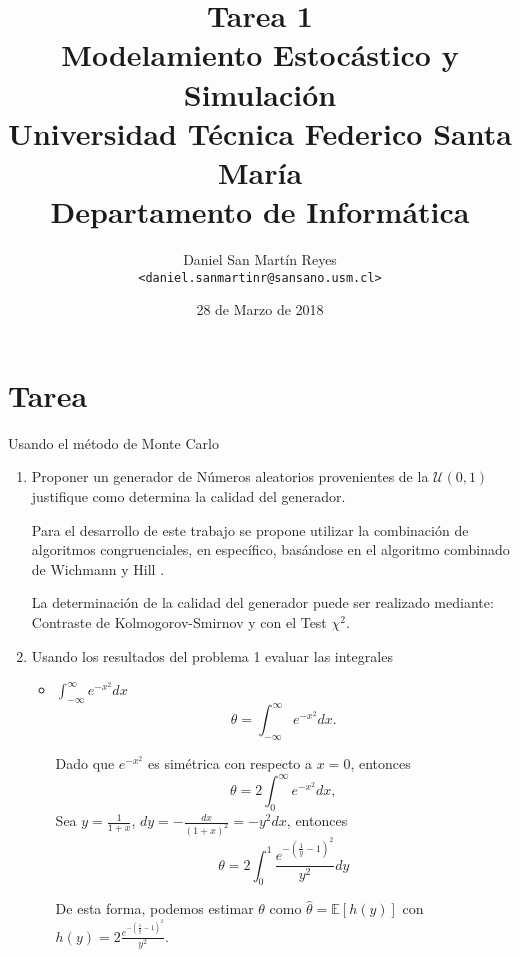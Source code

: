 \documentclass[12pt]{article}
\title{
  \large{\textbf{Tarea 1\\ Modelamiento Estocástico y Simulación}} \\
	\normalsize{Universidad Técnica Federico Santa María\\ Departamento de Informática\\}
}
\author{
  \normalsize Daniel San Martín Reyes \\ 
  \normalsize \texttt{<daniel.sanmartinr@sansano.usm.cl>}
}
\date{28 de Marzo de 2018}
\begin{document}
  \maketitle
      
  \section*{Tarea}
    Usando el método de Monte Carlo
    
    \begin{enumerate}
      \item Proponer un generador de Números aleatorios provenientes de la $\mathcal{U}(0,1)$ 
        justifique como determina la calidad del generador.

        Para el desarrollo de este trabajo se propone utilizar la combinación de algoritmos
        congruenciales, en específico, basándose en el algoritmo combinado de Wichmann y Hill
        \cite{wichmann1982algorithm}. \medskip

        La determinación de la calidad del generador puede ser realizado mediante: Contraste de 
        Kolmogorov-Smirnov y con el Test $\chi^2$.
         
          
      \item Usando los resultados del problema 1 evaluar las integrales 
        \begin{itemize}
          \item $\displaystyle \int_{-\infty}^{\infty}e^{-x^2}dx$
            \begin{equation}
                \theta  = \int_{-\infty}^{\infty}e^{-x^2}dx.
            \end{equation}
            
            Dado que $e^{-x^2}$ es simétrica con respecto a $x=0$, entonces
            \begin{equation}
                \theta  = 2\int_{0}^{\infty}e^{-x^2}dx,
            \end{equation}
            Sea $y = \frac{1}{1+x}$, $dy = -\frac{dx}{(1+x)^2}= -y^2dx$, entonces
            \begin{equation}
                \theta = 2\int_{0}^{1}\frac{e^{-(\frac1y-1)^2}}{y^2}dy
            \end{equation}
            
            De esta forma, podemos estimar $\theta$ como $\hat{\theta} = \mathbb{E}[h(y)]$
            con $ h(y) = 2\frac{e^{-(\frac1y-1)^2}}{y^2}$.
            

\end{itemize}
\end{enumerate}
\end{document}
